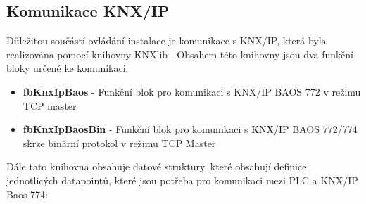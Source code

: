 \subsection{Komunikace KNX/IP}
Důležitou součástí ovládání instalace je komunikace s KNX/IP, která byla realizována pomocí knihovny KNXlib \cite{KNXlib}. Obsahem této knihovny jsou dva funkční bloky určené ke komunikaci:
\begin{itemize}
    \item \textbf{fbKnxIpBaos} - Funkční blok pro komunikaci s KNX/IP BAOS 772 v režimu TCP master
    \item  \textbf{fbKnxIpBaosBin} - Funkční blok pro komunikaci s KNX/IP BAOS 772/774 skrze binární protokol v režimu TCP Master \newline
\end{itemize}
Dále tato knihovna obsahuje datové struktury, které obsahují definice jednotlicých datapointů, které jsou potřeba pro komunikaci mezi PLC a KNX/IP Baos 774:
